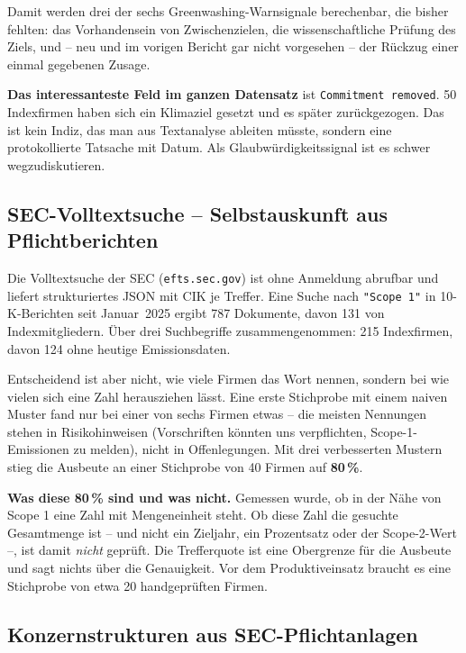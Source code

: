 \documentclass[11pt,a4paper]{article}
\newcommand{\befund}[1]{%
  \par\vspace{2pt}\noindent\colorbox{softgrey}{%
  \begin{minipage}{\dimexpr\linewidth-2\fboxsep}\small\vspace{3pt}#1\vspace{3pt}\end{minipage}}\par\vspace{4pt}}
\begin{document}
Damit werden drei der sechs Greenwashing-Warnsignale berechenbar, die bisher fehlten: das Vorhandensein von Zwischenzielen, die wissenschaftliche Prüfung des Ziels, und -- neu und im vorigen Bericht gar nicht vorgesehen -- der Rückzug einer einmal gegebenen Zusage.

\befund{\textbf{Das interessanteste Feld im ganzen Datensatz} ist \texttt{Commitment removed}. 50 Indexfirmen haben sich ein Klimaziel gesetzt und es später zurückgezogen. Das ist kein Indiz, das man aus Textanalyse ableiten müsste, sondern eine protokollierte Tatsache mit Datum. Als Glaubwürdigkeitssignal ist es schwer wegzudiskutieren.}

\subsection{SEC-Volltextsuche -- Selbstauskunft aus Pflichtberichten}

Die Volltextsuche der SEC (\texttt{efts.sec.gov}) ist ohne Anmeldung abrufbar und liefert strukturiertes JSON mit CIK je Treffer. Eine Suche nach \texttt{"Scope 1"} in 10-K-Berichten seit Januar~2025 ergibt 787 Dokumente, davon 131 von Indexmitgliedern. Über drei Suchbegriffe zusammengenommen: 215 Indexfirmen, davon 124 ohne heutige Emissionsdaten.

Entscheidend ist aber nicht, wie viele Firmen das Wort nennen, sondern bei wie vielen sich eine Zahl herausziehen lässt. Eine erste Stichprobe mit einem naiven Muster fand nur bei einer von sechs Firmen etwas -- die meisten Nennungen stehen in Risikohinweisen (\glqq Vorschriften könnten uns verpflichten, Scope-1-Emissionen zu melden\grqq), nicht in Offenlegungen. Mit drei verbesserten Mustern stieg die Ausbeute an einer Stichprobe von 40 Firmen auf \textbf{80\,\%}.

\befund{\textbf{Was diese 80\,\% sind und was nicht.} Gemessen wurde, ob in der Nähe von \glqq Scope 1\grqq{} eine Zahl mit Mengeneinheit steht. Ob diese Zahl die gesuchte Gesamtmenge ist -- und nicht ein Zieljahr, ein Prozentsatz oder der Scope-2-Wert --, ist damit \emph{nicht} geprüft. Die Trefferquote ist eine Obergrenze für die Ausbeute und sagt nichts über die Genauigkeit. Vor dem Produktiveinsatz braucht es eine Stichprobe von etwa 20 handgeprüften Firmen.}

\subsection{Konzernstrukturen aus SEC-Pflichtanlagen}
\end{document}
